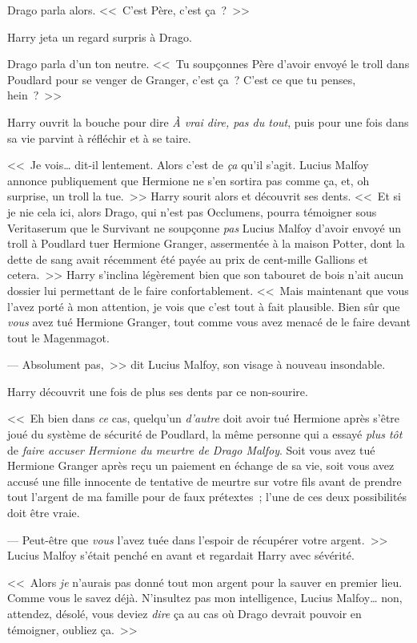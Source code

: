 Drago parla alors. <<~C'est Père, c'est ça~?~>>

Harry jeta un regard surpris à Drago.

Drago parla d'un ton neutre. <<~Tu soupçonnes Père d'avoir envoyé le troll dans Poudlard pour se venger de Granger, c'est ça~? C'est ce que tu penses, hein~?~>>

Harry ouvrit la bouche pour dire \emph{À vrai dire, pas du tout}, puis pour une fois dans sa vie parvint à réfléchir et à se taire.

<<~Je vois… dit-il lentement. Alors c'est de \emph{ça} qu'il s'agit. Lucius Malfoy annonce publiquement que Hermione ne s'en sortira pas comme ça, et, oh surprise, un troll la tue.~>> Harry sourit alors et découvrit ses dents. <<~Et si je nie cela ici, alors Drago, qui n'est pas Occlumens, pourra témoigner sous Veritaserum que le Survivant ne soupçonne \emph{pas} Lucius Malfoy d'avoir envoyé un troll à Poudlard tuer Hermione Granger, assermentée à la maison Potter, dont la dette de sang avait récemment été payée au prix de cent-mille Gallions et cetera.~>> Harry s'inclina légèrement bien que son tabouret de bois n'ait aucun dossier lui permettant de le faire confortablement. <<~Mais maintenant que vous l'avez porté à mon attention, je vois que c'est tout à fait plausible. Bien sûr que \emph{vous} avez tué Hermione Granger, tout comme vous avez menacé de le faire devant tout le Magenmagot.

--- Absolument pas,~>> dit Lucius Malfoy, son visage à nouveau insondable.

Harry découvrit une fois de plus ses dents par ce non-sourire.

<<~Eh bien dans \emph{ce} cas, quelqu'un \emph{d'autre} doit avoir tué Hermione après s'être joué du système de sécurité de Poudlard, la même personne qui a essayé \emph{plus tôt} de \emph{faire accuser Hermione du meurtre de Drago Malfoy}. Soit vous avez tué Hermione Granger après reçu un paiement en échange de sa vie, soit vous avez accusé une fille innocente de tentative de meurtre sur votre fils avant de prendre tout l'argent de ma famille pour de faux prétextes~; l'une de ces deux possibilités doit être vraie.

--- Peut-être que \emph{vous} l'avez tuée dans l'espoir de récupérer votre argent.~>> Lucius Malfoy s'était penché en avant et regardait Harry avec sévérité.

<<~Alors \emph{je} n'aurais pas donné tout mon argent pour la sauver en premier lieu. Comme vous le savez déjà. N'insultez pas mon intelligence, Lucius Malfoy… non, attendez, désolé, vous deviez \emph{dire} ça au cas où Drago devrait pouvoir en témoigner, oubliez ça.~>>

